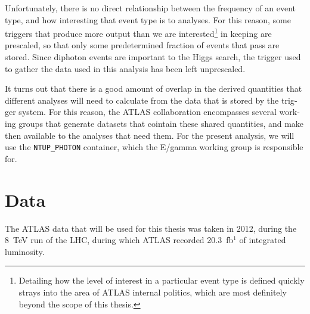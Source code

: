 \begin{english}
Unfortunately, there is no direct relationship between the frequency of an event type, and how interesting that event type is to analyses. For this reason, some triggers that produce more output than we are interested\footnote{Detailing how the level of interest in a particular event type is defined quickly strays into the area of ATLAS internal politics, which are most definitely beyond the scope of this thesis.} in keeping are prescaled, so that only some predetermined fraction of events that pass are stored. Since diphoton events are important to the Higgs search, the trigger used to gather the data used in this analysis has been left unprescaled.

It turns out that there is a good amount of overlap in the derived quantities that different analyses will need to calculate from the data that is stored by the trigger system. For this reason, the ATLAS collaboration encompasses several working groups that generate datasets that cointain these shared quantities, and make then available to the analyses that need them. For the present analysis, we will use the \texttt{NTUP\_PHOTON} container, which the E/gamma working group is responsible for.


\chapter{Data}
The ATLAS data that will be used for this thesis was taken in 2012, during the 8~TeV run of the LHC, during which ATLAS recorded 20.3~fb$^{1}$ of integrated luminosity.


\end{english}

